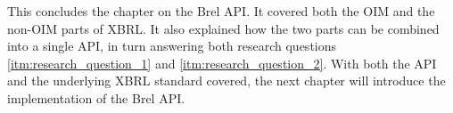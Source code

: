 
This concludes the chapter on the Brel API.
It covered both the OIM and the non-OIM parts of XBRL.
It also explained how the two parts can be combined into a single API, in turn answering both research questions \ref{itm:research_question_1} and \ref{itm:research_question_2}.
With both the API and the underlying XBRL standard covered, the next chapter will introduce the implementation of the Brel API.
